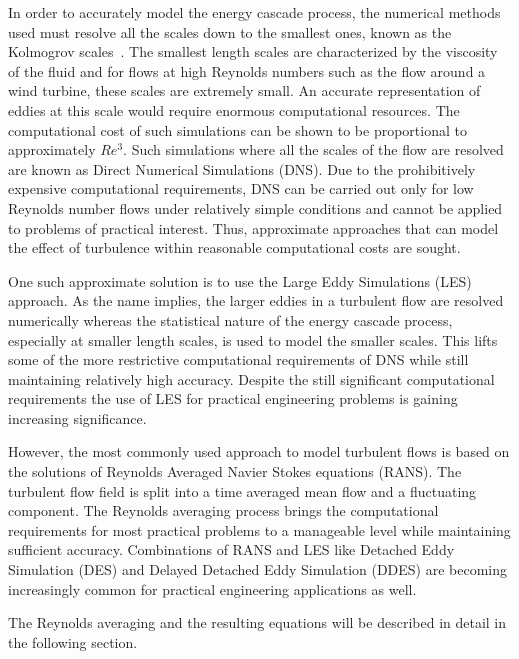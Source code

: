 In order to accurately model the energy cascade process, the numerical methods used must resolve all the scales down to the smallest ones, known as the Kolmogrov scales~\cite{Pope2000}. The smallest length scales are characterized by the viscosity of the fluid and for flows at high Reynolds numbers such as the flow around a wind turbine, these scales are extremely small. An accurate representation of eddies at this scale would require enormous computational resources. The computational cost of such simulations can be shown to be proportional to approximately $Re^3$. Such simulations where all the scales of the flow are resolved are known as Direct Numerical Simulations (DNS). Due to the prohibitively expensive computational requirements, DNS can be carried out only for low Reynolds number flows under relatively simple conditions and cannot be applied to problems of practical interest. Thus, approximate approaches that can model the effect of turbulence within reasonable computational costs are sought.

One such approximate solution is to use the Large Eddy Simulations (LES) approach. As the name implies, the larger eddies in a turbulent flow are resolved numerically whereas the statistical nature of the energy cascade process, especially at smaller length scales, is used to model the smaller scales. This lifts some of the more restrictive computational requirements of DNS while still maintaining relatively high accuracy. Despite the still significant computational requirements the use of LES for practical engineering problems is gaining increasing significance. 

However, the most commonly used approach to model turbulent flows is based on the solutions of Reynolds Averaged Navier Stokes equations (RANS). The turbulent flow field is split into a time averaged mean flow and a fluctuating component. The Reynolds averaging process brings the computational requirements for most practical problems to a manageable level while maintaining sufficient accuracy. Combinations of RANS and LES like Detached Eddy Simulation (DES) and Delayed Detached Eddy Simulation (DDES) are becoming increasingly common for practical engineering applications as well. 

The Reynolds averaging and the resulting equations will be described in detail in the following section.
